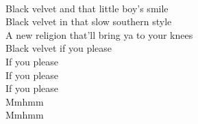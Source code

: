 \\
Black velvet and that little boy's smile \\
Black velvet in that slow southern style \\
A new religion that'll bring ya to your knees \\
Black velvet if you please \\
If you please \\
If you please \\
If you please \\
Mmhmm \\
Mmhmm \\
